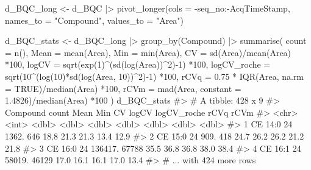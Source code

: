 \documentclass[
  letterpaper,
  DIV=11,
  numbers=noendperiod]{scrreprt}
\newenvironment{Shaded}{\begin{snugshade}}{\end{snugshade}}
\newcommand{\AttributeTok}[1]{\textcolor[rgb]{0.40,0.45,0.13}{#1}}
\newcommand{\CommentTok}[1]{\textcolor[rgb]{0.37,0.37,0.37}{#1}}
\newcommand{\ConstantTok}[1]{\textcolor[rgb]{0.56,0.35,0.01}{#1}}
\newcommand{\DecValTok}[1]{\textcolor[rgb]{0.68,0.00,0.00}{#1}}
\newcommand{\FloatTok}[1]{\textcolor[rgb]{0.68,0.00,0.00}{#1}}
\newcommand{\FunctionTok}[1]{\textcolor[rgb]{0.28,0.35,0.67}{#1}}
\newcommand{\NormalTok}[1]{\textcolor[rgb]{0.00,0.23,0.31}{#1}}
\newcommand{\OtherTok}[1]{\textcolor[rgb]{0.00,0.23,0.31}{#1}}
\newcommand{\SpecialCharTok}[1]{\textcolor[rgb]{0.37,0.37,0.37}{#1}}
\newcommand{\StringTok}[1]{\textcolor[rgb]{0.13,0.47,0.30}{#1}}
\begin{document}
\begin{Shaded}
\begin{Highlighting}[]
\NormalTok{d\_BQC\_long }\OtherTok{\textless{}{-}}\NormalTok{ d\_BQC }\SpecialCharTok{|\textgreater{}} \FunctionTok{pivot\_longer}\NormalTok{(}\AttributeTok{cols =} \SpecialCharTok{{-}}\NormalTok{seq\_no}\SpecialCharTok{:{-}}\NormalTok{AcqTimeStamp,}
                                    \AttributeTok{names\_to =} \StringTok{"Compound"}\NormalTok{,}
                                    \AttributeTok{values\_to =} \StringTok{"Area"}\NormalTok{)}

\NormalTok{d\_BQC\_stats }\OtherTok{\textless{}{-}}\NormalTok{ d\_BQC\_long }\SpecialCharTok{|\textgreater{}} 
  \FunctionTok{group\_by}\NormalTok{(Compound) }\SpecialCharTok{|\textgreater{}} 
  \FunctionTok{summarise}\NormalTok{(}
    \AttributeTok{count =} \FunctionTok{n}\NormalTok{(),}
    \AttributeTok{Mean =} \FunctionTok{mean}\NormalTok{(Area),}
    \AttributeTok{Min =} \FunctionTok{min}\NormalTok{(Area),}
    \AttributeTok{CV =} \FunctionTok{sd}\NormalTok{(Area)}\SpecialCharTok{/}\FunctionTok{mean}\NormalTok{(Area) }\SpecialCharTok{*}\DecValTok{100}\NormalTok{,}
    \AttributeTok{logCV =} \FunctionTok{sqrt}\NormalTok{(}\FunctionTok{exp}\NormalTok{(}\DecValTok{1}\NormalTok{)}\SpecialCharTok{\^{}}\NormalTok{(}\FunctionTok{sd}\NormalTok{(}\FunctionTok{log}\NormalTok{(Area))}\SpecialCharTok{\^{}}\DecValTok{2}\NormalTok{)}\SpecialCharTok{{-}}\DecValTok{1}\NormalTok{) }\SpecialCharTok{*}\DecValTok{100}\NormalTok{,}
    \AttributeTok{logCV\_roche =} \FunctionTok{sqrt}\NormalTok{(}\DecValTok{10}\SpecialCharTok{\^{}}\NormalTok{(}\FunctionTok{log}\NormalTok{(}\DecValTok{10}\NormalTok{)}\SpecialCharTok{*}\FunctionTok{sd}\NormalTok{(}\FunctionTok{log}\NormalTok{(Area, }\DecValTok{10}\NormalTok{))}\SpecialCharTok{\^{}}\DecValTok{2}\NormalTok{)}\SpecialCharTok{{-}}\DecValTok{1}\NormalTok{) }\SpecialCharTok{*}\DecValTok{100}\NormalTok{,}
    \AttributeTok{rCVq =} \FloatTok{0.75} \SpecialCharTok{*} \FunctionTok{IQR}\NormalTok{(Area, }\AttributeTok{na.rm =} \ConstantTok{TRUE}\NormalTok{)}\SpecialCharTok{/}\FunctionTok{median}\NormalTok{(Area) }\SpecialCharTok{*}\DecValTok{100}\NormalTok{,}
    \AttributeTok{rCVm =} \FunctionTok{mad}\NormalTok{(Area, }\AttributeTok{constant =} \FloatTok{1.4826}\NormalTok{)}\SpecialCharTok{/}\FunctionTok{median}\NormalTok{(Area) }\SpecialCharTok{*}\DecValTok{100}
\NormalTok{  )}
\NormalTok{d\_BQC\_stats}
\CommentTok{\#\textgreater{} \# A tibble: 428 x 9}
\CommentTok{\#\textgreater{}   Compound count    Mean   Min    CV logCV logCV\_roche  rCVq  rCVm}
\CommentTok{\#\textgreater{}   \textless{}chr\textgreater{}    \textless{}int\textgreater{}   \textless{}dbl\textgreater{} \textless{}dbl\textgreater{} \textless{}dbl\textgreater{} \textless{}dbl\textgreater{}       \textless{}dbl\textgreater{} \textless{}dbl\textgreater{} \textless{}dbl\textgreater{}}
\CommentTok{\#\textgreater{} 1 CE 14:0     24   1362.   646  18.8  21.3        21.3  13.4  12.9}
\CommentTok{\#\textgreater{} 2 CE 15:0     24    909.   418  24.7  26.2        26.2  21.2  21.8}
\CommentTok{\#\textgreater{} 3 CE 16:0     24 136417. 67788  35.5  36.8        36.8  38.0  38.4}
\CommentTok{\#\textgreater{} 4 CE 16:1     24  58019. 46129  17.0  16.1        16.1  17.0  13.4}
\CommentTok{\#\textgreater{} \# ... with 424 more rows}


\end{Highlighting}
\end{Shaded}
\end{document}
